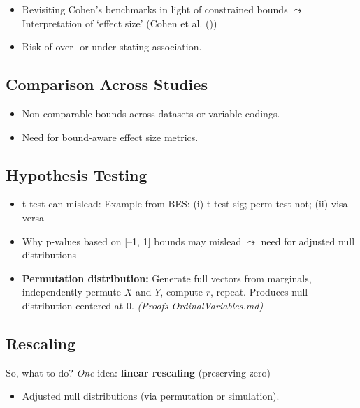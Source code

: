 \documentclass[
  12pt,
]{article}
\providecommand{\tightlist}{%
  \setlength{\itemsep}{0pt}\setlength{\parskip}{0pt}}
\theoremstyle{plain}
\theoremstyle{definition}
\theoremstyle{remark}
\begin{document}
\begin{itemize}
\tightlist
\item
  Revisiting Cohen's benchmarks in light of constrained bounds
  \(\leadsto\) Interpretation of `effect size' (Cohen et al.
  ())
\item
  Risk of over- or under-stating association.
\end{itemize}

\subsection{Comparison Across Studies}\label{comparison-across-studies}

\begin{itemize}
\tightlist
\item
  Non-comparable bounds across datasets or variable codings.
\item
  Need for bound-aware effect size metrics.
\end{itemize}

\subsection{Hypothesis Testing}\label{hypothesis-testing}

\begin{itemize}
\tightlist
\item
  t-test can mislead: Example from BES: (i) t-test sig; perm test not;
  (ii) visa versa
\item
  Why p-values based on {[}--1, 1{]} bounds may mislead \(\leadsto\)
  need for adjusted null distributions
\item
  \textbf{Permutation distribution:} Generate full vectors from
  marginals, independently permute \(X\) and \(Y\), compute \(r\),
  repeat. Produces null distribution centered at 0.
  \emph{(Proofs-OrdinalVariables.md)}
\end{itemize}

\subsection{Rescaling}\label{rescaling}

So, what to do? \emph{One} idea: \textbf{linear rescaling} (preserving
zero)

\begin{itemize}
\tightlist
\item
  Adjusted null distributions (via permutation or simulation).
\end{itemize}
\end{document}
